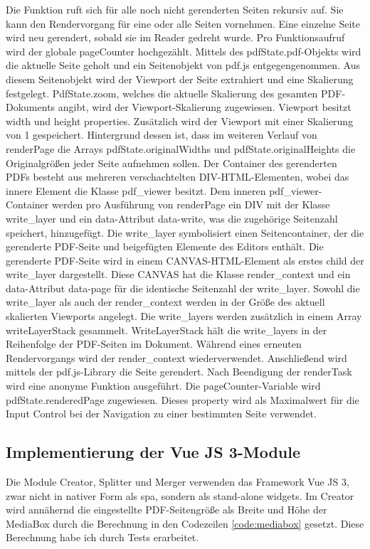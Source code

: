 Die Funktion ruft sich für alle noch nicht gerenderten Seiten rekursiv auf. Sie kann den Rendervorgang für eine oder alle Seiten vornehmen. Eine einzelne Seite wird neu gerendert, sobald sie im Reader gedreht wurde. Pro Funktionsaufruf wird der globale pageCounter hochgezählt. Mittels des pdfState.pdf-Objekts wird die aktuelle Seite geholt und ein Seitenobjekt von pdf.js entgegengenommen. Aus diesem Seitenobjekt wird der Viewport der Seite extrahiert und eine Skalierung festgelegt. PdfState.zoom, welches die aktuelle Skalierung des gesamten PDF-Dokuments angibt, wird der Viewport-Skalierung zugewiesen. Viewport besitzt width und height properties. Zusätzlich wird der Viewport mit einer Skalierung von 1 gespeichert. Hintergrund dessen ist, dass im weiteren Verlauf von renderPage die Arrays pdfState.originalWidths und pdfState.originalHeights die Originalgrößen jeder Seite aufnehmen sollen. Der Container des gerenderten PDFs besteht aus mehreren verschachtelten DIV-HTML-Elementen, wobei das innere Element die Klasse pdf\_viewer besitzt. Dem inneren pdf\_viewer-Container werden pro Ausführung von renderPage ein DIV mit der Klasse write\_layer und ein data-Attribut data-write, was die zugehörige Seitenzahl speichert, hinzugefügt. Die write\_layer symbolisiert einen Seitencontainer, der die gerenderte PDF-Seite und beigefügten Elemente des Editors enthält. Die gerenderte PDF-Seite wird in einem CANVAS-HTML-Element als erstes child der write\_layer dargestellt. Diese CANVAS hat die Klasse render\_context und ein data-Attribut data-page für die identische Seitenzahl der write\_layer. Sowohl die write\_layer als auch der render\_context werden in der Größe des aktuell skalierten Viewports angelegt. Die write\_layers werden zusätzlich in einem Array writeLayerStack gesammelt. WriteLayerStack hält die write\_layers in der Reihenfolge der PDF-Seiten im Dokument. Während eines erneuten Rendervorgangs wird der render\_context wiederverwendet. Anschließend wird mittels der pdf.js-Library die Seite gerendert. Nach Beendigung der renderTask wird eine anonyme Funktion ausgeführt. Die pageCounter-Variable wird pdfState.renderedPage zugewiesen. Dieses property wird als Maximalwert für die Input Control bei der Navigation zu einer bestimmten Seite verwendet.

\subsection{Implementierung der Vue JS 3-Module}
Die Module Creator, Splitter und Merger verwenden das Framework Vue JS 3, zwar nicht in nativer Form als \gls{spa}, sondern als stand-alone widgets. Im Creator wird annähernd die eingestellte PDF-Seitengröße als Breite und Höhe der MediaBox durch die Berechnung in den Codezeilen \ref{code:mediabox} gesetzt. Diese Berechnung habe ich durch Tests erarbeitet.

